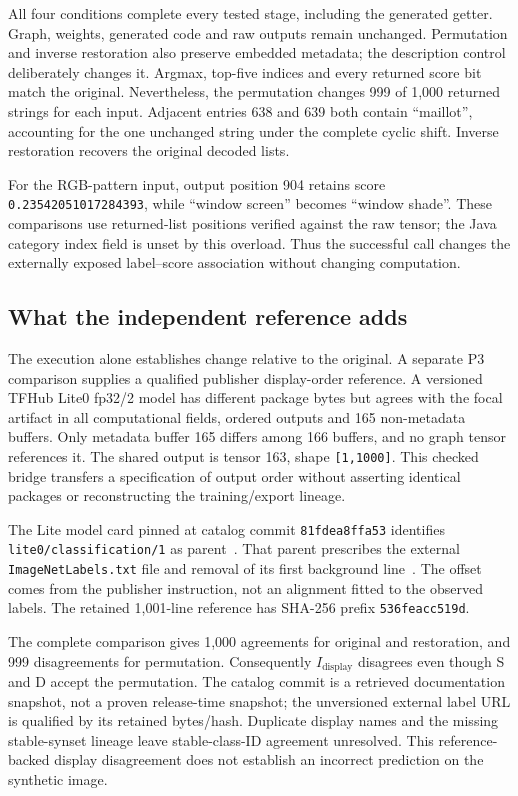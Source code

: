\documentclass[10pt,twocolumn,letterpaper]{article}
\newcommand{\code}[1]{\texttt{#1}}
\begin{document}
All four conditions complete every tested stage, including the generated getter. Graph, weights, generated code and raw outputs remain unchanged. Permutation and inverse restoration also preserve embedded metadata; the description control deliberately changes it. Argmax, top-five indices and every returned score bit match the original. Nevertheless, the permutation changes 999 of 1,000 returned strings for each input. Adjacent entries 638 and 639 both contain ``maillot'', accounting for the one unchanged string under the complete cyclic shift. Inverse restoration recovers the original decoded lists.

For the RGB-pattern input, output position 904 retains score \code{0.23542051017284393}, while ``window screen'' becomes ``window shade''. These comparisons use returned-list positions verified against the raw tensor; the Java category index field is unset by this overload. Thus the successful call changes the externally exposed label--score association without changing computation.

\subsection{What the independent reference adds}
\label{sec:p3}
The execution alone establishes change relative to the original. A separate P3 comparison supplies a qualified publisher display-order reference. A versioned TFHub Lite0 fp32/2 model has different package bytes but agrees with the focal artifact in all computational fields, ordered outputs and 165 non-metadata buffers. Only metadata buffer 165 differs among 166 buffers, and no graph tensor references it. The shared output is tensor 163, shape \code{[1,1000]}. This checked bridge transfers a specification of output order without asserting identical packages or reconstructing the training/export lineage.

The Lite model card pinned at catalog commit \code{81fdea8ffa53} identifies \code{lite0/classification/1} as parent~\cite{tfhub-lite-card}. That parent prescribes the external \code{ImageNetLabels.txt} file and removal of its first background line~\cite{tfhub-parent-card,imagenet-display}. The offset comes from the publisher instruction, not an alignment fitted to the observed labels. The retained 1,001-line reference has SHA-256 prefix \code{536feacc519d}.

The complete comparison gives 1,000 agreements for original and restoration, and 999 disagreements for permutation. Consequently $I_{\mathrm{display}}$ disagrees even though S and D accept the permutation. The catalog commit is a retrieved documentation snapshot, not a proven release-time snapshot; the unversioned external label URL is qualified by its retained bytes/hash. Duplicate display names and the missing stable-synset lineage leave stable-class-ID agreement unresolved. This reference-backed display disagreement does not establish an incorrect prediction on the synthetic image.
\end{document}
